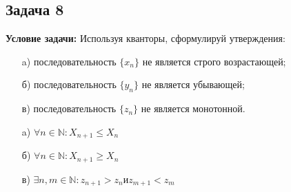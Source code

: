 \documentclass[a4paper,12pt]{article}
\begin{document}
\subsection{Задача 8}
\textbf{Условие задачи:}
Используя кванторы, сформулируй утверждения:
\begin{itemize}
    \item[a)] последовательность \(\{x_n\}\) не является строго возрастающей;
    \item[б)] последовательность \(\{y_n\}\) не является убывающей;
    \item[в)] последовательность \(\{z_n\}\) не является монотонной.
\end{itemize}
\begin{itemize}
    \item[a)] $\forall n \in \mathbb{N}: X_{n+1}\le X_{n}$
    \item[б)] $\forall n \in \mathbb{N}: X_{n+1}\ge X_{n}$
    \item[в)] $\exists n, m \in \mathbb{N}: z_{n+1}>z_{n} и z_{m+1}<z_{m}$
\end{itemize}
\vspace{1cm}
\end{document}
